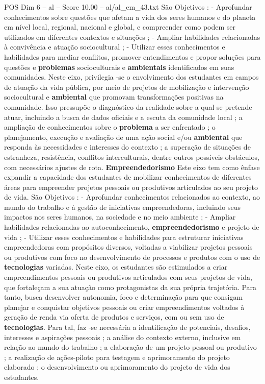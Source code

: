 \begin{textsample}{POS Dim 6 – al – Score 10.00 – al/al\_em\_43.txt}
São Objetivos : - Aprofundar conhecimentos sobre questões que afetam a vida dos seres humanos e do planeta em nível local, regional, nacional e global, e compreender como podem ser utilizados em diferentes contextos e situações ; - Ampliar habilidades relacionadas à convivência e atuação sociocultural ; - Utilizar esses conhecimentos e habilidades para mediar conflitos, promover entendimentos e propor soluções para questões e \textbf{problemas} socioculturais e \textbf{ambientais} identificados em suas comunidades.
Neste eixo, privilegia -se o envolvimento dos estudantes em campos de atuação da vida pública, por meio de projetos de mobilização e intervenção sociocultural e \textbf{ambiental} que promovam transformações positivas na comunidade.
Isso pressupõe o diagnóstico da realidade sobre a qual se pretende atuar, incluindo a busca de dados oficiais e a escuta da comunidade local ; a ampliação de conhecimentos sobre o \textbf{problema} a ser enfrentado ; o planejamento, execução e avaliação de uma ação social e/ou \textbf{ambiental} que responda às necessidades e interesses do contexto ; a superação de situações de estranheza, resistência, conflitos interculturais, dentre outros possíveis obstáculos, com necessários ajustes de rota. \textbf{Empreendedorismo} Este eixo tem como ênfase expandir a capacidade dos estudantes de mobilizar conhecimentos de diferentes áreas para empreender projetos pessoais ou produtivos articulados ao seu projeto de vida.
São Objetivos : - Aprofundar conhecimentos relacionados ao contexto, ao mundo do trabalho e à gestão de iniciativas empreendedoras, incluindo seus impactos nos seres humanos, na sociedade e no meio ambiente ; - Ampliar habilidades relacionadas ao autoconhecimento, \textbf{empreendedorismo} e projeto de vida ; - Utilizar esses conhecimentos e habilidades para estruturar iniciativas empreendedoras com propósitos diversos, voltadas a viabilizar projetos pessoais ou produtivos com foco no desenvolvimento de processos e produtos com o uso de \textbf{tecnologias} variadas.
Neste eixo, os estudantes são estimulados a criar empreendimentos pessoais ou produtivos articulados com seus projetos de vida, que fortaleçam a sua atuação como protagonistas da sua própria trajetória.
Para tanto, busca desenvolver autonomia, foco e determinação para que consigam planejar e conquistar objetivos pessoais ou criar empreendimentos voltados à geração de renda via oferta de produtos e serviços, com ou sem uso de \textbf{tecnologias}.
Para tal, faz -se necessária a identificação de potenciais, desafios, interesses e aspirações pessoais ; a análise do contexto externo, inclusive em relação ao mundo do trabalho ; a elaboração de um projeto pessoal ou produtivo ; a realização de ações-piloto para testagem e aprimoramento do projeto elaborado ; o desenvolvimento ou aprimoramento do projeto de vida dos estudantes.

\end{textsample}
